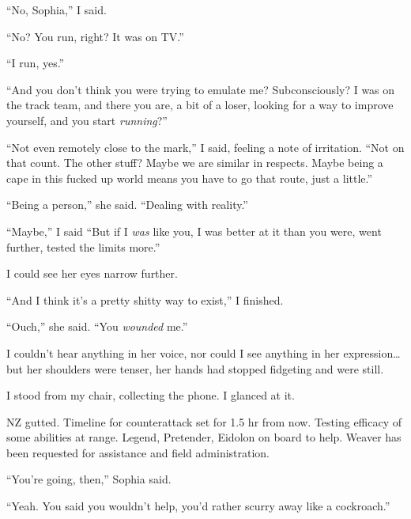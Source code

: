 ``No, Sophia,'' I said.



``No?  You run, right?  It was on TV.''



``I run, yes.''



``And you don't think you were trying to emulate me?  Subconsciously?  I was on the track team, and there you are, a bit of a loser, looking for a way to improve yourself, and you start \emph{running}?''



``Not even remotely close to the mark,'' I said, feeling a note of irritation.  ``Not on that count.  The other stuff?  Maybe we are similar in respects.  Maybe being a cape in this fucked up world means you have to go that route, just a little.''



``Being a person,'' she said.  ``Dealing with reality.''



``Maybe,'' I said  ``But if I \emph{was} like you, I was better at it than you were, went further, tested the limits more.''



I could see her eyes narrow further.



``And I think it's a pretty shitty way to exist,'' I finished.



``Ouch,'' she said.  ``You \emph{wounded} me.''



I couldn't hear anything in her voice, nor could I see anything in her expression\ldots but her shoulders were tenser, her hands had stopped fidgeting and were still.



I stood from my chair, collecting the phone.  I glanced at it.



NZ gutted.  Timeline for counterattack set for 1.5 hr from now.  Testing efficacy of some abilities at range.  Legend, Pretender, Eidolon on board to help.  Weaver has been requested for assistance and field administration.



``You're going, then,'' Sophia said.



``Yeah.  You said you wouldn't help, you'd rather scurry away like a cockroach.''



